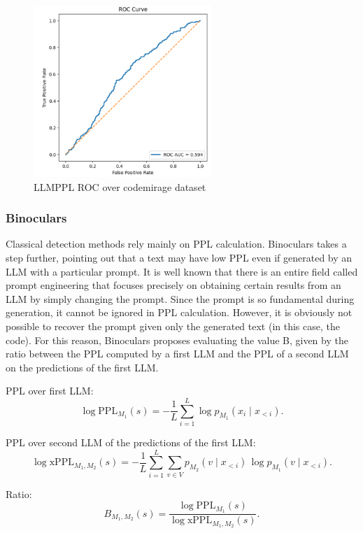 \begin{figure}[H]
    \centering
    \includegraphics[width=0.6\textwidth]{img/LLMPPL/AUC.png}
    \caption{LLMPPL ROC over codemirage dataset}
    \label{fig:LLMPPL ROC over codemirage dataset}
\end{figure}


\clearpage
\subsubsection{Binoculars}
\newcommand{\PPL}{\mathrm{PPL}}
\newcommand{\xPPL}{\mathrm{xPPL}}
Classical detection methods rely mainly on PPL calculation. 
Binoculars takes a step further, pointing out that a text may 
have low PPL even if generated by an LLM with a particular prompt. 
It is well known that there is an entire field called prompt 
engineering that focuses precisely on obtaining certain results 
from an LLM by simply changing the prompt. Since the prompt is so 
fundamental during generation, it cannot be ignored in PPL calculation. 
However, it is obviously not possible to recover the prompt given only 
the generated text (in this case, the code). For this reason, 
Binoculars proposes evaluating the value 
B, given by the ratio between the PPL computed by a first LLM and the PPL of a second LLM on the predictions of the first LLM.

PPL over first LLM:
\[
\log \PPL_{M_1}(s)
= -\frac{1}{L}\sum_{i=1}^{L}\log p_{M_1}(x_i\mid x_{<i}).
\]

PPL over second LLM of the predictions of the first LLM:
\[
\log \xPPL_{M_1,M_2}(s)
= -\frac{1}{L}\sum_{i=1}^{L}\sum_{v\in V}
p_{M_2}(v\mid x_{<i})\,\log p_{M_1}(v\mid x_{<i}).
\]

Ratio:
\[
B_{M_1,M_2}(s)=\frac{\log \PPL_{M_1}(s)}{\log \xPPL_{M_1,M_2}(s)}.
\]


